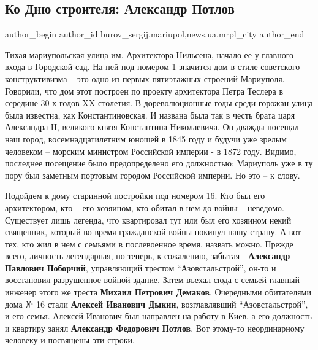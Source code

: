  
 
 
 
 
 
\subsection{Ко Дню строителя: Александр Потлов}
\label{sec:10_08_2019.stz.news.ua.mrpl_city.1.ko_dnu_stroitelja_aleksandr_potlov}
 
\ifcmt
 author_begin
   author_id burov_sergij.mariupol,news.ua.mrpl_city
 author_end
\fi


Тихая мариупольская улица им. Архитектора Нильсена, начало ее у главного входа
в Городской сад. На ней под номером 1 значится дом в стиле советского
конструктивизма – это одно из первых пятиэтажных строений Мариуполя. Говорили,
что дом этот построен по проекту архитектора Петра Теслера в середине 30-х
годов XX столетия. В дореволюционные годы среди горожан улица была известна,
как Константиновская. И названа была так в честь брата царя Александра ΙΙ,
великого князя Константина Николаевича. Он дважды посещал наш город,
восемнадцатилетним юношей в 1845 году и будучи уже зрелым человеком – морским
министром Российской империи - в 1872 году. Видимо, последнее посещение было
предопределено его должностью: Мариуполь уже в ту пору был заметным портовым
городом Российской империи. Но это – к слову.

Подойдем к дому старинной постройки под номером 16. Кто был его архитектором,
кто – его хозяином, кто обитал в нем до войны – неведомо. Существует лишь
легенда, что квартировал тут или был его хозяином некий священник, который во
время гражданской войны покинул нашу страну. А вот тех, кто жил в нем с семьями
в послевоенное время, назвать можно. Прежде всего, личность легендарная, но
теперь, к сожалению, забытая - \textbf{Александр Павлович Поборчий}, управляющий трестом
\enquote{Азовстальстрой}, он-то и восстановил разрушенное войной здание. Затем въехал
сюда с семьей главный инженер этого же треста \textbf{Михаил Петрович Демаков}.
Очередными обитателями дома № 16 стали \textbf{Алексей Иванович Дыкин}, возглавлявший
\enquote{Азовстальстрой}, и его семья. Алексей Иванович был направлен на работу в Киев,
а его должность и квартиру занял \textbf{Александр Федорович Потлов}. Вот этому-то
неординарному человеку и посвящены эти строки.

